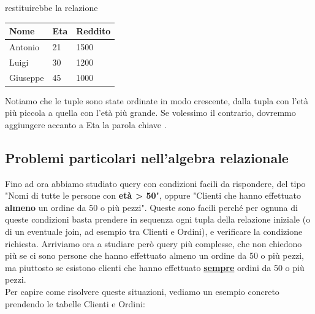 \documentclass[11pt, a4paper, titlepage, oneside]{scrbook}
\begin{document}
restituirebbe la relazione

\begin{center}
\begin{tabular}{|l|l|l|}
\hline
\textbf{Nome} & \textbf{Eta} & \textbf{Reddito} \\ \hline
Antonio & 21 & 1500 \\
Luigi & 30 & 1200 \\
Giuseppe & 45 & 1000 \\ \hline
\end{tabular}
\end{center}

Notiamo che le tuple sono state ordinate in modo crescente, dalla tupla con l'età più piccola a quella con l'età più grande. Se volessimo il contrario, dovremmo aggiungere accanto a Eta la parola chiave .

\subsection{Problemi particolari nell'algebra relazionale}

Fino ad ora abbiamo studiato query con condizioni facili da rispondere, del tipo "Nomi di tutte le persone con \textbf{età > 50}", oppure "Clienti che hanno effettuato \textbf{almeno} un ordine da 50 o più pezzi". Queste sono facili perché per ognuna di queste condizioni basta prendere in sequenza ogni tupla della relazione iniziale (o di un eventuale join, ad esempio tra Clienti e Ordini), e verificare la condizione richiesta. Arriviamo ora a studiare però query più complesse, che non chiedono più se ci sono persone che hanno effettuato almeno un ordine da 50 o più pezzi, ma piuttosto se esistono clienti che hanno effettuato \underline{\textbf{sempre}} ordini da 50 o più pezzi. \\
Per capire come risolvere queste situazioni, vediamo un esempio concreto prendendo le tabelle Clienti e Ordini:
\end{document}
